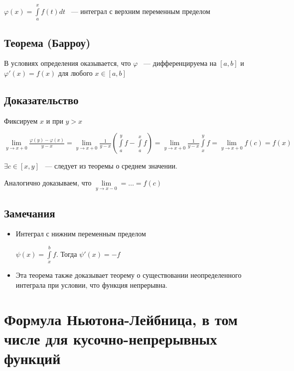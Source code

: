 \documentclass{article}
\begin{document}
			$\varphi (x) = \int\limits^x_a f(t)dt$ ~--- интеграл с верхним переменным пределом
		
		\subsection{Теорема (Барроу)}
		
			В условиях определения оказывается, что $\varphi$ ~--- дифференцируема на $[a, b]$ и $\varphi'(x) = f(x)$ для любого $x \in [a, b]$
		
		\subsection{Доказательство}
		
			Фиксируем $x$ и при $y > x$
		
			$\lim\limits_{y \rightarrow x + 0} \frac{\varphi(y) - \varphi(x)}{y - x} = \lim\limits_{y \rightarrow x + 0} \frac{1}{y - x} \left( \int\limits^y_a f - \int\limits^x_a f \right) = \lim\limits_{y \rightarrow x + 0} \frac{1}{y - x} \int\limits^y_x f = \lim\limits_{y \rightarrow x + 0} f(c) = f(x)$
		
			$\exists c \in [x, y]$ ~--- следует из теоремы о среднем значении.
		
			Аналогично доказываем, что $\lim\limits_{y \rightarrow x - 0} = \ldots = f(c)$
		
		\subsection{Замечания}
		
			\begin{itemize}
			
				\item Интеграл с нижним переменным пределом
				
					$\psi(x) = \int\limits^b_x f$. Тогда $\psi'(x) = -f$
					
				\item Эта теорема также доказывает теорему о существовании неопределенного интеграла при условии, что функция непрерывна.
				
			\end{itemize}
			
	\newpage
	
	\section{Формула Ньютона-Лейбница, в том числе для кусочно-непрерывных функций}
	
\end{document}
